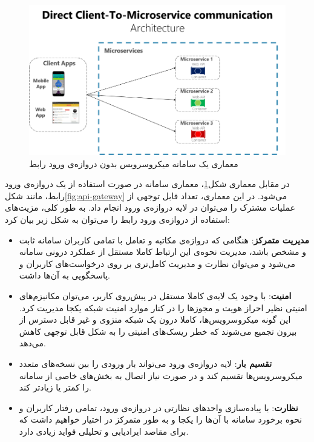 \begin{figure}[h]
	\vspace{1cm}
	\centering
	\includegraphics[scale=1.4]{figures/direct-client-to-microservice-communication.png}
	\caption{معماری یک سامانه میکروسرویس بدون ‌دروازه‌ی ورود رابط\cite{Microsoft_API_Gateway_2023}}
	\label{fig:no-api-gateway}
\end{figure}

در مقابل معماری شکل\ref{fig:no-api-gateway}، معماری سامانه در صورت استفاده از یک دروازه‌ی ورود رابط، مانند شکل\ref{fig:api-gateway} می‌شود. در این معماری، تعداد قابل توجهی از عملیات مشترک را می‌توان در لایه ‌دروازه‌ی ورود انجام داد. به طور کلی، مزیت‌های استفاده از ‌دروازه‌ی ورود رابط را می‌توان به شکل زیر بیان کرد\cite{Microsoft_API_Gateway_2023}:

\begin{itemize}
	\item \textbf{مدیریت متمرکز}: هنگامی که دروازه‌ی مکاتبه و تعامل با تمامی کاربران سامانه ثابت و مشخص باشد، مدیریت نحوه‌ی این ارتباط کاملا مستقل از عملکرد درونی سامانه می‌شود و می‌توان نظارت و مدیریت کامل‌تری بر روی درخواست‌های کاربران و پاسخگویی به آن‌ها داشت.
	
	\item \textbf{امنیت}: با وجود یک لایه‌ی کاملا مستقل در پیش‌روی کاربر، می‌توان مکانیزم‌های امنیتی نظیر احراز هویت و مجوزها را در کنار موارد امنیت شبکه یکجا مدیریت کرد. این گونه میکروسرویس‌ها، کاملا درون یک شبکه منزوی و غیر قابل دسترس از بیرون تجمیع می‌شوند که خطر ریسک‌های امنیتی را به شکل قابل توجهی کاهش می‌دهد.
	
	\item \textbf{تقسیم بار}: لایه ‌دروازه‌ی ورود می‌تواند بار ورودی را بین نسخه‌های متعدد میکروسرویس‌ها تقسیم کند و در صورت نیاز اتصال به بخش‌های خاصی از سامانه را کمتر یا زیادتر کند.
	
\item \textbf{نظارت}: با پیاده‌سازی واحدهای نظارتی در ‌دروازه‌ی ورود، تمامی رفتار کاربران و نحوه برخورد‌ سامانه با آن‌ها را یکجا و به ‌طور متمرکز در اختیار خواهیم داشت که برای مقاصد ایرادیابی و تحلیلی فواید زیادی دارد.
\end{itemize}

